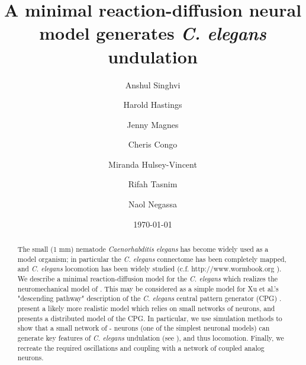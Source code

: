\documentclass[
    11pt,
]{article}
\begin{document}


\title{A minimal reaction-diffusion neural model generates {\emph{C. elegans}} undulation}

\author[1]{Anshul Singhvi}

\author[1,3]{Harold Hastings}

\author[2]{Jenny Magnes}

\author[2]{Cheris Congo}

\author[2]{Miranda Hulsey-Vincent}

\author[1]{Rifah Tasnim}

\author[1]{Naol Negassa}


\date{\today}

\begin{abstract}
    The small (1 mm) nematode \emph{Caenorhabditis elegans} has become widely used as a model organism; in particular the \emph{C. elegans} connectome has been completely mapped, and \emph{C. elegans} locomotion has been widely studied (c.f. http://www.wormbook.org \citet{corsi2015}). We describe a minimal reaction-diffusion model for the \emph{C. elegans} which realizes the neuromechanical model of \citet{izquierdo2018}. This  may be considered as a simple model for Xu et al.'s "descending pathway" description of the \emph{C. elegans} central pattern generator (CPG) \citet{xu2018,wen2012}. \citet{olivares2019} present a likely more realistic model which relies on small networks of neurons, and presents a distributed model of the CPG. In particular, we use simulation methods to show that a small network of \citet{fitzhugh1955}-\citet{nagumo1962} neurons (one of the simplest neuronal models) can generate key features of \emph{C. elegans} undulation (see \citet{magnes2012}), and thus locomotion.  Finally, we recreate the required oscillations and coupling with a network of coupled \citet{keener1983} analog neurons.
\end{abstract}

\maketitle
\end{document}
